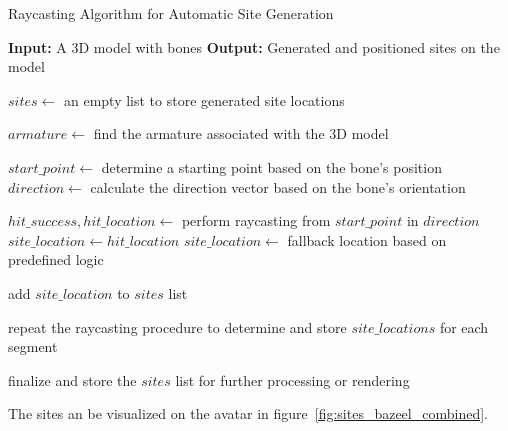 \documentclass[../../main.tex]{subfiles}
\begin{document}
\begin{algorithm}
    \label{alg:site_generation_with_raycasting}
    \caption{Raycasting Algorithm for Automatic Site Generation}
    \begin{algorithmic}
        \State \textbf{Input:} A 3D model with bones
        \State \textbf{Output:} Generated and positioned sites on the model

        \State $sites \gets$ an empty list to store generated site locations

        \State {}

        \State $armature \gets$ find the armature associated with the 3D model

            \State $start\_point \gets$ determine a starting point based on the bone's position
            \State $direction \gets$ calculate the direction vector based on the bone's orientation
            
            \State $hit\_success, hit\_location \gets$ perform raycasting from $start\_point$ in $direction$
                \State $site\_location \gets hit\_location$
            \Else
                \State $site\_location \gets$ fallback location based on predefined logic
            \EndIf

            \State add $site\_location$ to $sites$ list
            
            \State {}
        \EndFor

                \State repeat the raycasting procedure to determine and store $site\_locations$ for each segment
            \EndFor
        \EndFor

        \State finalize and store the $sites$ list for further processing or rendering
    \end{algorithmic}
\end{algorithm}

The sites an be visualized on the avatar in figure~\ref{fig:sites_bazeel_combined}.
\end{document}
